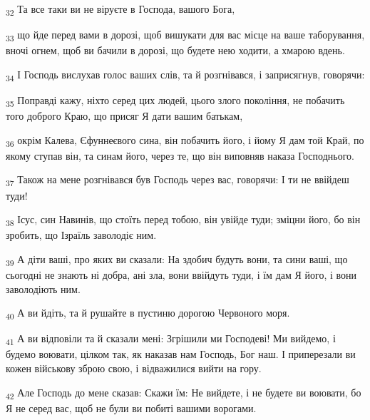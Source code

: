 \begin{tcolorbox}
\textsubscript{32} Та все таки ви не віруєте в Господа, вашого Бога,
\end{tcolorbox}
\begin{tcolorbox}
\textsubscript{33} що йде перед вами в дорозі, щоб вишукати для вас місце на ваше таборування, вночі огнем, щоб ви бачили в дорозі, що будете нею ходити, а хмарою вдень.
\end{tcolorbox}
\begin{tcolorbox}
\textsubscript{34} І Господь вислухав голос ваших слів, та й розгнівався, і заприсягнув, говорячи:
\end{tcolorbox}
\begin{tcolorbox}
\textsubscript{35} Поправді кажу, ніхто серед цих людей, цього злого покоління, не побачить того доброго Краю, що присяг Я дати вашим батькам,
\end{tcolorbox}
\begin{tcolorbox}
\textsubscript{36} окрім Калева, Єфуннеєвого сина, він побачить його, і йому Я дам той Край, по якому ступав він, та синам його, через те, що він виповняв наказа Господнього.
\end{tcolorbox}
\begin{tcolorbox}
\textsubscript{37} Також на мене розгнівався був Господь через вас, говорячи: І ти не ввійдеш туди!
\end{tcolorbox}
\begin{tcolorbox}
\textsubscript{38} Ісус, син Навинів, що стоїть перед тобою, він увійде туди; зміцни його, бо він зробить, що Ізраїль заволодіє ним.
\end{tcolorbox}
\begin{tcolorbox}
\textsubscript{39} А діти ваші, про яких ви сказали: На здобич будуть вони, та сини ваші, що сьогодні не знають ні добра, ані зла, вони ввійдуть туди, і їм дам Я його, і вони заволодіють ним.
\end{tcolorbox}
\begin{tcolorbox}
\textsubscript{40} А ви йдіть, та й рушайте в пустиню дорогою Червоного моря.
\end{tcolorbox}
\begin{tcolorbox}
\textsubscript{41} А ви відповіли та й сказали мені: Згрішили ми Господеві! Ми вийдемо, і будемо воювати, цілком так, як наказав нам Господь, Бог наш. І приперезали ви кожен військову зброю свою, і відважилися вийти на гору.
\end{tcolorbox}
\begin{tcolorbox}
\textsubscript{42} Але Господь до мене сказав: Скажи їм: Не вийдете, і не будете ви воювати, бо Я не серед вас, щоб не були ви побиті вашими ворогами.
\end{tcolorbox}
